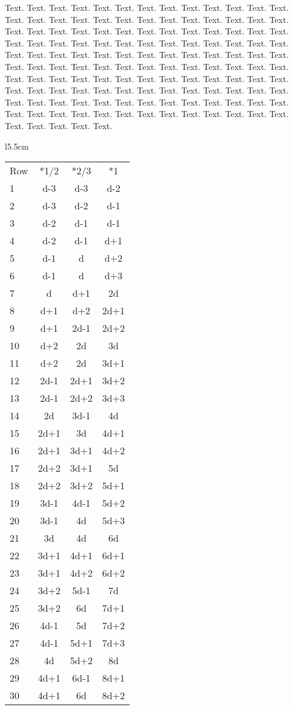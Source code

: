 \documentclass{article}
\begin{document}
Text. Text. Text. Text. Text. Text. Text. Text. Text. Text. Text. Text. Text. Text. Text.
Text. Text. Text. Text. Text. Text. Text. Text. Text. Text. Text. Text. Text. Text. Text.
Text. Text. Text. Text. Text. Text. Text. Text. Text. Text. Text. Text. Text. Text. Text.
Text. Text. Text. Text. Text. Text. Text. Text. Text. Text. Text. Text. Text. Text. Text.
Text. Text. Text. Text. Text. Text. Text. Text. Text. Text. Text. Text. Text. Text. Text.
Text. Text. Text. Text. Text. Text. Text. Text. Text. Text. Text. Text. Text. Text. Text.
Text. Text. Text. Text. Text. Text. Text. Text. Text. Text. Text. Text. Text. Text. Text.
Text. Text. Text. Text. Text. Text. Text. Text. Text. Text. Text. Text. Text. Text. Text.
Text. Text. Text. Text. Text. Text. Text. Text. Text. Text. Text. Text. Text. Text. Text.

\begin{wraptable}{l}{5.5cm}
\begin{tabular}{l | c | c | c}
Row& *1/2 & *2/3 & *1    \\
1  & d-3  & d-3  & d-2   \\
2  & d-3  & d-2  & d-1   \\
3  & d-2  & d-1  & d-1   \\
4  & d-2  & d-1  & d+1   \\
5  & d-1  & d    & d+2   \\
6  & d-1  & d    & d+3   \\
7  & d    & d+1  & 2d    \\
8  & d+1  & d+2  & 2d+1  \\
9  & d+1  & 2d-1 & 2d+2  \\
10 & d+2  & 2d   & 3d    \\
11 & d+2  & 2d   & 3d+1  \\
12 & 2d-1 & 2d+1 & 3d+2  \\
13 & 2d-1 & 2d+2 & 3d+3  \\
14 & 2d   & 3d-1 & 4d    \\
15 & 2d+1 & 3d   & 4d+1  \\
16 & 2d+1 & 3d+1 & 4d+2  \\
17 & 2d+2 & 3d+1 & 5d    \\
18 & 2d+2 & 3d+2 & 5d+1  \\
19 & 3d-1 & 4d-1 & 5d+2  \\
20 & 3d-1 & 4d   & 5d+3  \\
21 & 3d   & 4d   & 6d    \\
22 & 3d+1 & 4d+1 & 6d+1  \\
23 & 3d+1 & 4d+2 & 6d+2  \\
24 & 3d+2 & 5d-1 & 7d    \\
25 & 3d+2 & 6d   & 7d+1  \\
26 & 4d-1 & 5d   & 7d+2  \\
27 & 4d-1 & 5d+1 & 7d+3  \\
28 & 4d   & 5d+2 & 8d    \\
29 & 4d+1 & 6d-1 & 8d+1  \\
30 & 4d+1 & 6d   & 8d+2
\end{tabular}
\end{wraptable}
\end{document}
